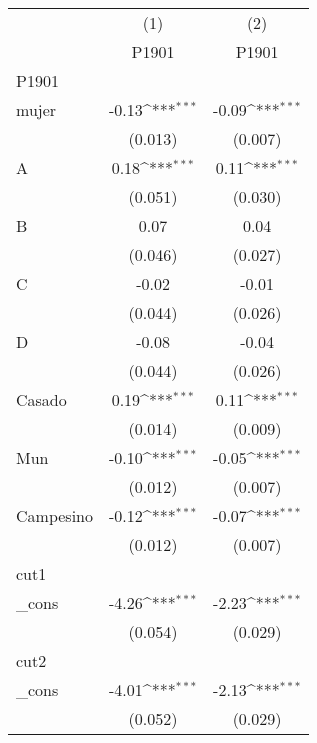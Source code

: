 {
\def\sym#1{\ifmmode^{#1}\else\(^{#1}\)\fi}
\begin{tabular}{l*{2}{c}}
\hline\hline
            &\multicolumn{1}{c}{(1)}&\multicolumn{1}{c}{(2)}\\
            &\multicolumn{1}{c}{P1901}&\multicolumn{1}{c}{P1901}\\
\hline
P1901       &                     &                     \\
mujer       &       -0.13\sym{***}&       -0.09\sym{***}\\
            &     (0.013)         &     (0.007)         \\
[1em]
A           &        0.18\sym{***}&        0.11\sym{***}\\
            &     (0.051)         &     (0.030)         \\
[1em]
B           &        0.07         &        0.04         \\
            &     (0.046)         &     (0.027)         \\
[1em]
C           &       -0.02         &       -0.01         \\
            &     (0.044)         &     (0.026)         \\
[1em]
D           &       -0.08         &       -0.04         \\
            &     (0.044)         &     (0.026)         \\
[1em]
Casado      &        0.19\sym{***}&        0.11\sym{***}\\
            &     (0.014)         &     (0.009)         \\
[1em]
Mun         &       -0.10\sym{***}&       -0.05\sym{***}\\
            &     (0.012)         &     (0.007)         \\
[1em]
Campesino   &       -0.12\sym{***}&       -0.07\sym{***}\\
            &     (0.012)         &     (0.007)         \\
\hline
cut1        &                     &                     \\
\_cons      &       -4.26\sym{***}&       -2.23\sym{***}\\
            &     (0.054)         &     (0.029)         \\
\hline
cut2        &                     &                     \\
\_cons      &       -4.01\sym{***}&       -2.13\sym{***}\\
            &     (0.052)         &     (0.029)         \\

\end{tabular}}
